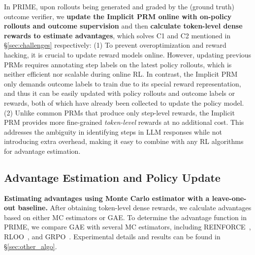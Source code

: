 In PRIME, upon rollouts being generated and graded by the (ground truth) outcome verifier, we \textbf{update the Implicit PRM online with on-policy rollouts and outcome supervision} and then \textbf{calculate token-level dense rewards to estimate advantages}, which solves C1 and C2 mentioned in \S \ref{sec:challenges} respectively:
(1) To prevent overoptimization and reward hacking, it is crucial to update reward models online. However, updating previous PRMs \citep{Lightman2023LetsVS} requires annotating step labels on the latest policy rollouts, which is neither efficient nor scalable during online RL.
In contrast, the Implicit PRM only demands outcome labels to train due to its special reward representation, and thus it can be easily updated with policy rollouts and outcome labels or rewards, both of which have already been collected to update the policy model.
(2) Unlike common PRMs that produce only step-level rewards, the Implicit PRM provides more fine-grained \textit{token-level} rewards at no additional cost. This addresses the ambiguity in identifying steps in LLM responses while not introducing extra overhead, making it easy to combine with any RL algorithms for advantage estimation.


\iffalse
\begin{equation}
    \label{eq:ce}
    \mathcal{L}_{\text{CE}} = l \cdot \log \sigma \left( \beta \log \frac{\pi_\phi(\mathbf{y})}{\pi_\text{ref}(\mathbf{y})} \right)+ (1 - l) \cdot \log \left[ 1 - \sigma \left( \beta \log \frac{\pi_\phi(\mathbf{y})}{\pi_\text{ref}(\mathbf{y})} \right) \right]
\end{equation}
\fi



\subsection{Advantage Estimation and Policy Update}
\label{sec:prime_loss_adv}



\textbf{Estimating advantages using Monte Carlo estimator with a leave-one-out baseline.}
After obtaining token-level dense rewards, we calculate advantages based on either MC estimators or GAE.
To determine the advantage function in PRIME, we compare GAE with several MC estimators, including REINFORCE~\citep{williams1992simple}, RLOO~\citep{ahmadian2024back}, and GRPO~\citep{deepseek-math}. Experimental details and results can be found in \S \ref{sec:other_algo}.

